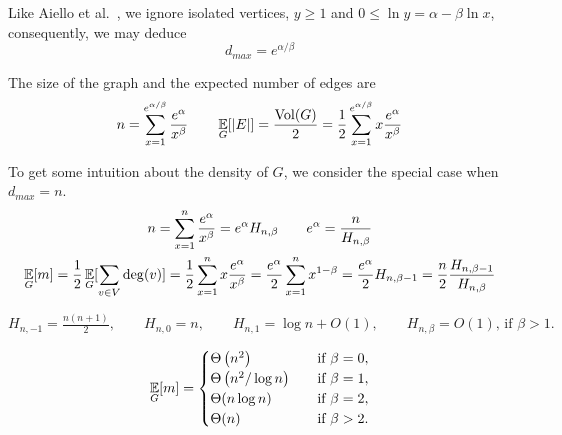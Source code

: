 Like Aiello et al.~\cite{acl01}, we ignore isolated vertices, $y\geq1$
and $0\leq\ln y=\alpha-\beta\ln x$, consequently, we may deduce
\begin{equation}
    d_{max}=e^{\alpha/\beta}
\end{equation}

The size of the graph and the expected number of edges are
\begin{equation}
    \label{eq:powerlaw-coin-toss-n-e}
    n=\sum_{x=1}^{e^{\alpha/\beta}}{\frac{e^\alpha}{x^\beta}}
    \qquad \mathop{{}\mathbb{E}}_G[|E|]=\frac{\operatorname*{Vol}(G)}{2}=\frac{1}{2}\sum_{x=1}^{e^{\alpha/\beta}}{x\frac{e^\alpha}{x^\beta}}
\end{equation}

%
%
%
%

To get some intuition about the density of $G$,
we consider the special case when $d_{max}=n$.
\begin{gather}
    n=\sum_{x=1}^{n}\frac{e^\alpha}{x^\beta}=e^\alpha H_{n,\beta} \qquad e^\alpha=\frac{n}{H_{n,\beta}}\\
    \mathop{{}\mathbb{E}}_G[m]=\frac{1}{2}\mathop{{}\mathbb{E}}_G[\sum_{v \in V}\deg(v)]=\frac{1}{2}\sum_{x=1}^{n}x\frac{e^\alpha}{x^\beta}
    =\frac{e^\alpha}{2}\sum_{x=1}^{n}x^{1-\beta}=\frac{e^\alpha}{2}H_{n,\beta-1}
    =\frac{n}{2}\frac{H_{n,\beta-1}}{H_{n,\beta}}
\end{gather}

$H_{n,-1}=\frac{n(n+1)}{2},
\qquad H_{n,0}=n,
\qquad H_{n,1}=\log n+O(1),
\qquad H_{n,\beta}=O(1)\text{, if }\beta>1.$

\begin{equation}
    \mathop{{}\mathbb{E}}_G[m]=
    \begin{cases}
        \Theta\left(n^2\right) & \quad \text{if } \beta=0,\\
        \Theta\left(n^2/\log n\right) & \quad \text{if } \beta=1,\\
        \Theta(n\log n) & \quad \text{if } \beta=2,\\
        \Theta(n) & \quad \text{if } \beta>2.
    \end{cases}
\end{equation}

